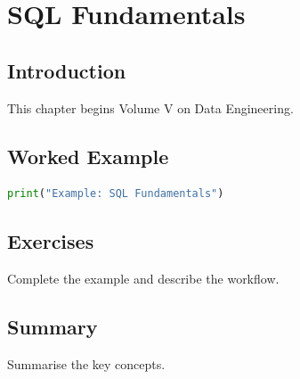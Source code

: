 \chapter{SQL Fundamentals}
\label{chap:vol5-3}



\section{Introduction}
This chapter begins Volume V on Data Engineering.

\section{Worked Example}
\begin{lstlisting}[language=Python]
print("Example: SQL Fundamentals")
\end{lstlisting}

\section{Exercises}
\begin{exercise}
Complete the example and describe the workflow.
\end{exercise}

\section{Summary}
Summarise the key concepts.

